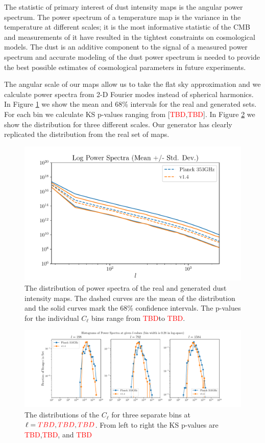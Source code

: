 \documentclass[twocolumn]{aastex62}
\def\tbd{\textcolor{red}{TBD}}
\begin{document}
The statistic of primary interest of dust intensity maps is the angular power spectrum. The power spectrum of a temperature map is the variance in the temperature at different scales; it is the most informative statistic of the CMB and measurements of it have resulted in the tightest constraints on cosmological models. The  dust is an additive  component to the signal of a measured power spectrum and accurate modeling of the dust power spectrum is needed to provide the best possible estimates of cosmological parameters in future experiments. 

The angular scale of our maps allow us to take the flat sky approximation and we calculate power spectra from 2-D Fourier modes instead of spherical harmonics. In Figure \ref{fig:power} we show the mean and 68\% intervals for the real and generated sets. For  each bin we calculate KS p-values ranging from [\tbd,\tbd]. In Figure \ref{fig:powerhist} we show the distribution for three different  scales. Our generator has clearly replicated the distribution from the real set of maps.

\begin{figure}
\includegraphics[width = .5\textwidth]{LogPowerSpectra.pdf}
\caption{The distribution of power spectra of the real and generated dust intensity maps. The dashed curves are the mean of the distribution and the solid curves mark the 68\% confidence intervals. The p-values for the individual $C_{\ell}$ bins range from \tbd to \tbd. }
\label{fig:power}
\end{figure}

\begin{figure}[!tbh]
\includegraphics[width = \textwidth]{HistPowerSpectraSlices.pdf}
\caption{The distributions of the $C_{\ell}$ for three separate bins at $\ell=\tbd,\tbd,\tbd$. From left to right the KS p-values are \tbd,\tbd, and \tbd}
\label{fig:powerhist}
\end{figure}
\end{document}
